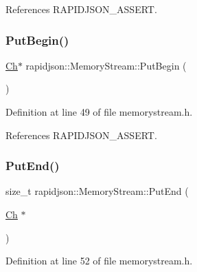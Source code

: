 References R\+A\+P\+I\+D\+J\+S\+O\+N\+\_\+\+A\+S\+S\+E\+RT.

\mbox{\label{structrapidjson_1_1_memory_stream_a9cda045c9d01e18c4d4b06b2afe2edf2}} 
\subsubsection{\texorpdfstring{PutBegin()}{PutBegin()}}
{\footnotesize\ttfamily \mbox{\hyperlink{structrapidjson_1_1_memory_stream_abf9f7cf51a5830ae45e24f5d55fdceaf}{Ch}}$\ast$ rapidjson\+::\+Memory\+Stream\+::\+Put\+Begin (\begin{DoxyParamCaption}{ }\end{DoxyParamCaption})}



Definition at line 49 of file memorystream.\+h.


\begin{DoxyCode}{0}

\end{DoxyCode}


References R\+A\+P\+I\+D\+J\+S\+O\+N\+\_\+\+A\+S\+S\+E\+RT.

\mbox{\label{structrapidjson_1_1_memory_stream_a2135b36b12e5fcd2ee575b9a9cdb579c}} 
\subsubsection{\texorpdfstring{PutEnd()}{PutEnd()}}
{\footnotesize\ttfamily size\+\_\+t rapidjson\+::\+Memory\+Stream\+::\+Put\+End (\begin{DoxyParamCaption}\item[{\mbox{\hyperlink{structrapidjson_1_1_memory_stream_abf9f7cf51a5830ae45e24f5d55fdceaf}{Ch}} $\ast$}]{ }\end{DoxyParamCaption})}



Definition at line 52 of file memorystream.\+h.


